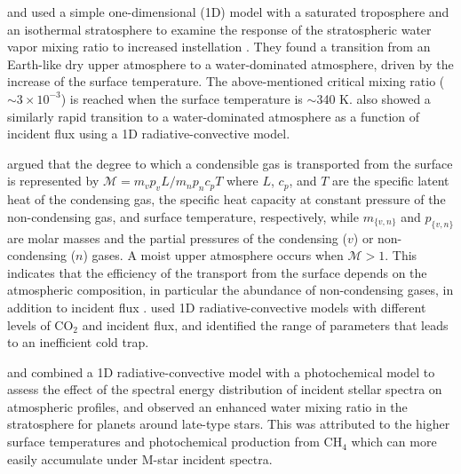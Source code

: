 \documentclass[11pt,numberedappendix,twocolappendix,]{emulateapj}
\def\wv{water vapor}
\def\revise#1{{\color{red}{#1}}}
\begin{document}
\citet{Kasting1993} and \citet{Kopparapu2013} used a simple one-dimensional (1D) model with a saturated troposphere and an isothermal stratosphere to examine the response of the stratospheric \wv{} mixing ratio to increased instellation \revise{\citep[see also][]{Kasting2015}}. 
They found a transition from an Earth-like dry upper atmosphere to a water-dominated atmosphere, driven by the increase of the surface temperature. 
The above-mentioned critical mixing ratio ($\sim 3 \times 10^{-3}$) is reached when the surface temperature is $\sim $340 K. 
\citet{Kodama2015} also showed a similarly rapid transition to a water-dominated atmosphere as a function of incident flux using a 1D radiative-convective model.  

\citet{Wordsworth2013,Wordsworth2014} argued that the degree to which a condensible gas is transported from the surface is represented by $\mathcal{M} = m_v p_v L / m_n p_n c_p T $ where $L$, $c_p$, and $T$ are the specific latent heat of the condensing gas, the specific heat capacity at constant pressure of the non-condensing gas, and surface  temperature, respectively, while $m_{\{v,n\}}$ and $p_{\{v,n\}}$ are molar masses and the partial pressures of the  condensing ($v$) or non-condensing ($n$) gases. 
A moist upper atmosphere occurs when $\mathcal{M} > 1$. 
This indicates that the efficiency of the transport from the surface depends on the atmospheric composition, in particular the abundance of non-condensing gases, in addition to incident flux \citep{Wordsworth2014}. 
\citet{Wordsworth2013} used 1D radiative-convective models with different levels of CO$_2$ and incident flux, and identified the range of parameters that leads to an inefficient cold trap. 

\citet{Rauer2011} and \citet{Rugheimer2013,Rugheimer2015} combined a 1D radiative-convective model with a photochemical model to assess the effect of the spectral energy distribution of incident stellar spectra on atmospheric profiles, and observed an enhanced water mixing ratio in the stratosphere for planets around late-type stars. This was attributed to the higher surface temperatures and photochemical production from CH$_4$ which can more easily accumulate under M-star incident spectra. 
\end{document}
